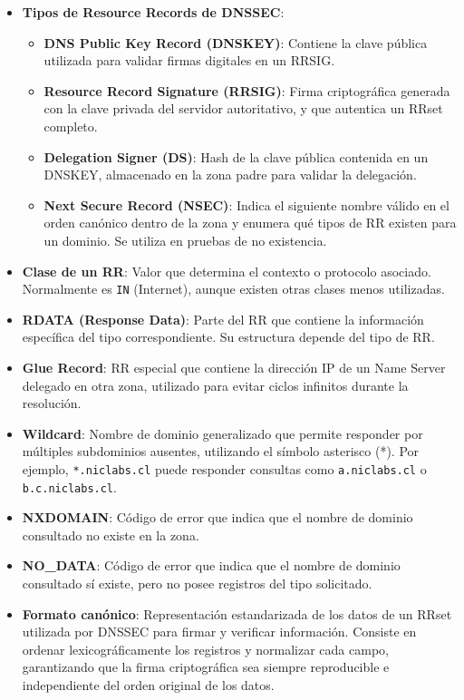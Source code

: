 \begin{itemize}
    \item \textbf{Tipos de Resource Records de DNSSEC}:
        \begin{itemize}
            \item \textbf{DNS Public Key Record (DNSKEY)}: Contiene la clave pública utilizada para validar firmas digitales en un RRSIG.
            \item \textbf{Resource Record Signature (RRSIG)}: Firma criptográfica generada con la clave privada del servidor autoritativo, y que autentica un RRset completo.
            \item \textbf{Delegation Signer (DS)}: Hash de la clave pública contenida en un DNSKEY, almacenado en la zona padre para validar la delegación.
            \item \textbf{Next Secure Record (NSEC)}: Indica el siguiente nombre válido en el orden canónico dentro de la zona y enumera qué tipos de RR existen para un dominio. 
                   Se utiliza en pruebas de no existencia.
        \end{itemize}

    \item \textbf{Clase de un RR}: Valor que determina el contexto o protocolo asociado. Normalmente es \texttt{IN} (Internet), aunque existen otras clases menos utilizadas.

    \item \textbf{RDATA (Response Data)}: Parte del RR que contiene la información específica del tipo correspondiente. Su estructura depende del tipo de RR.

    \item \textbf{Glue Record}: RR especial que contiene la dirección IP de un Name Server delegado en otra zona, utilizado para evitar ciclos infinitos durante la resolución.

    \item \textbf{Wildcard}: Nombre de dominio generalizado que permite responder por múltiples subdominios ausentes, utilizando el símbolo asterisco (*). Por ejemplo, 
           \texttt{*.niclabs.cl} puede responder consultas como \texttt{a.niclabs.cl} o \texttt{b.c.niclabs.cl}.

    \item \textbf{NXDOMAIN}: Código de error que indica que el nombre de dominio consultado no existe en la zona.

    \item \textbf{NO\_DATA}: Código de error que indica que el nombre de dominio consultado sí existe, pero no posee registros del tipo solicitado.
    
    \item \textbf{Formato canónico}: Representación estandarizada de los datos de un RRset utilizada por DNSSEC para firmar y verificar información.
      Consiste en ordenar lexicográficamente los registros y normalizar cada campo, garantizando que la firma criptográfica sea siempre reproducible e independiente del orden 
      original de los datos.


\end{itemize}


